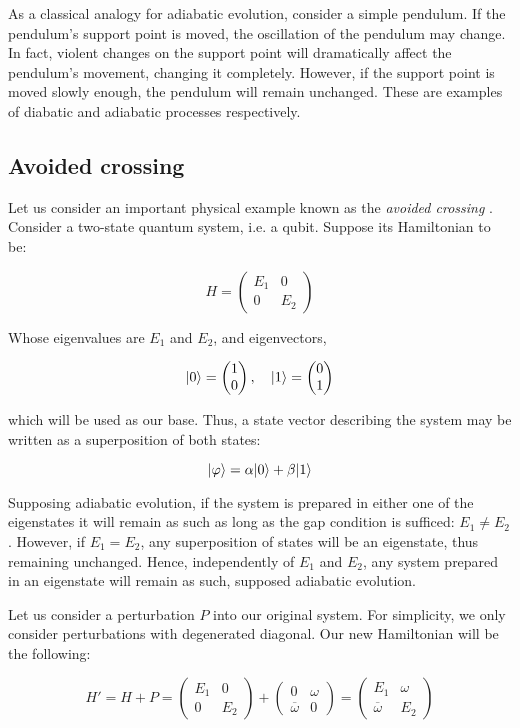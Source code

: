 As a classical analogy for adiabatic evolution, consider a simple pendulum. If the pendulum's support point is moved, the oscillation of the pendulum may change. In fact, violent changes on the support point will dramatically affect the pendulum's movement, changing it completely. However, if the support point is moved slowly enough, the pendulum will remain unchanged. These are examples of diabatic and adiabatic processes respectively.


\subsection{Avoided crossing}


Let us consider an important physical example known as the \emph{avoided crossing} \cite{Cohen-Tannoudji2006}. Consider a two-state quantum system, i.e. a qubit. Suppose its Hamiltonian to be:

$$
	H = 
	\begin{pmatrix}
		E_1 & 0 \\
		0 & E_2 
	\end{pmatrix}
$$

Whose eigenvalues are $E_1$ and $E_2$, and eigenvectors,

$$
	|0\rangle = 
	\begin{pmatrix}
	1 \\
	0 
	\end{pmatrix}, \quad
	|1\rangle = 
	\begin{pmatrix}
	0 \\
	1 
	\end{pmatrix}
$$

which will be used as our base. Thus, a state vector describing the system may be written as a superposition of both states:

$$ |\varphi\rangle = \alpha|0\rangle + \beta|1\rangle $$

Supposing adiabatic evolution, if the system is prepared in either one of the eigenstates it will remain as such as long as the gap condition is sufficed: $E_1 \neq E_2$. However, if $E_1 = E_2$, any superposition of states will be an eigenstate, thus remaining unchanged. Hence, independently of $E_1$ and $E_2$, any system prepared in an eigenstate will remain as such, supposed adiabatic evolution.

Let us consider a perturbation $P$ into our original system. For simplicity, we only consider perturbations with degenerated diagonal. Our new Hamiltonian will be the following:

$$
	H' = H + P =
	\begin{pmatrix}
	E_1 & 0 \\
	0 & E_2 
	\end{pmatrix} +
	\begin{pmatrix}
	0 & \omega \\
	\overline \omega & 0 
	\end{pmatrix} = 
	\begin{pmatrix}
	E_1 & \omega \\
	\overline \omega & E_2 
	\end{pmatrix}
$$

